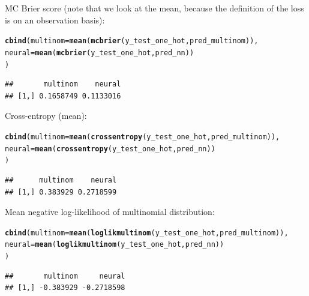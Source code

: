 \documentclass[a4paper]{article}
\makeatletter
\newcommand{\hlstd}[1]{\textcolor[rgb]{0.345,0.345,0.345}{#1}}%
\newcommand{\hlkwc}[1]{\textcolor[rgb]{0.333,0.667,0.333}{#1}}%
\newcommand{\hlkwd}[1]{\textcolor[rgb]{0.737,0.353,0.396}{\textbf{#1}}}%
\newenvironment{kframe}{%
 \def\at@end@of@kframe{}%
 \ifinner\ifhmode%
  \def\at@end@of@kframe{\end{minipage}}%
  \begin{minipage}{\columnwidth}%
 \fi\fi%
 \def\FrameCommand##1{\hskip\@totalleftmargin \hskip-\fboxsep
 \colorbox{shadecolor}{##1}\hskip-\fboxsep
     \hskip-\linewidth \hskip-\@totalleftmargin \hskip\columnwidth}%
 \MakeFramed {\advance\hsize-\width
   \@totalleftmargin\z@ \linewidth\hsize
   \@setminipage}}%
 {\par\unskip\endMakeFramed%
 \at@end@of@kframe}
\newenvironment{knitrout}{}{} %
\makeatother
\begin{document}
{\begin{enumerate}
MC Brier score (note that we look at the mean, because the definition of the loss is on an observation basis):

\begin{knitrout}
\color{fgcolor}\begin{kframe}
\begin{alltt}
\hlkwd{cbind}\hlstd{(}\hlkwc{multinom} \hlstd{=} \hlkwd{mean}\hlstd{(}\hlkwd{mcbrier}\hlstd{(y_test_one_hot, pred_multinom)),}
      \hlkwc{neural} \hlstd{=} \hlkwd{mean}\hlstd{(}\hlkwd{mcbrier}\hlstd{(y_test_one_hot, pred_nn))}
\hlstd{)}
\end{alltt}
\begin{verbatim}
##       multinom    neural
## [1,] 0.1658749 0.1133016
\end{verbatim}
\end{kframe}
\end{knitrout}

Cross-entropy (mean):

\begin{knitrout}
\color{fgcolor}\begin{kframe}
\begin{alltt}
\hlkwd{cbind}\hlstd{(}\hlkwc{multinom} \hlstd{=} \hlkwd{mean}\hlstd{(}\hlkwd{crossentropy}\hlstd{(y_test_one_hot, pred_multinom)),}
      \hlkwc{neural} \hlstd{=} \hlkwd{mean}\hlstd{(}\hlkwd{crossentropy}\hlstd{(y_test_one_hot, pred_nn))}
\hlstd{)}
\end{alltt}
\begin{verbatim}
##      multinom    neural
## [1,] 0.383929 0.2718599
\end{verbatim}
\end{kframe}
\end{knitrout}

Mean negative log-likelihood of multinomial distribution:

\begin{knitrout}
\color{fgcolor}\begin{kframe}
\begin{alltt}
\hlkwd{cbind}\hlstd{(}\hlkwc{multinom} \hlstd{=} \hlkwd{mean}\hlstd{(}\hlkwd{loglikmultinom}\hlstd{(y_test_one_hot, pred_multinom)),}
      \hlkwc{neural} \hlstd{=} \hlkwd{mean}\hlstd{(}\hlkwd{loglikmultinom}\hlstd{(y_test_one_hot, pred_nn))}
\hlstd{)}
\end{alltt}
\begin{verbatim}
##       multinom     neural
## [1,] -0.383929 -0.2718598
\end{verbatim}
\end{kframe}
\end{knitrout}


\end{enumerate}
}
\end{document}
